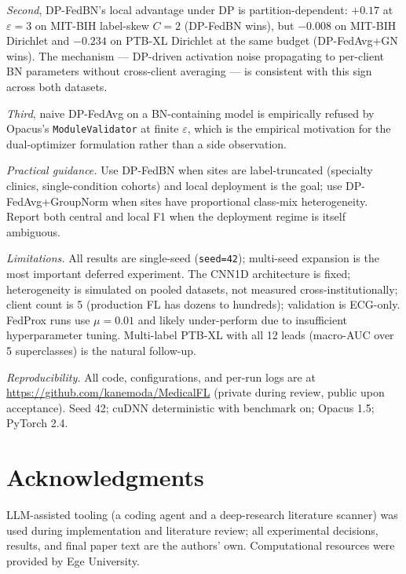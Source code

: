 \documentclass[conference]{IEEEtran}
\newcommand{\code}[1]{\texttt{\small #1}}
\begin{document}
\emph{Second}, DP-FedBN's local advantage under DP is partition-dependent: $+0.17$ at $\varepsilon{=}3$ on MIT-BIH label-skew $C{=}2$ (DP-FedBN wins), but $-0.008$ on MIT-BIH Dirichlet and $-0.234$ on PTB-XL Dirichlet at the same budget (DP-FedAvg+GN wins). The mechanism --- DP-driven activation noise propagating to per-client BN parameters without cross-client averaging --- is consistent with this sign across both datasets.

\emph{Third}, naive DP-FedAvg on a BN-containing model is empirically refused by Opacus's \code{ModuleValidator} at finite $\varepsilon$, which is the empirical motivation for the dual-optimizer formulation rather than a side observation.

\emph{Practical guidance.} Use DP-FedBN when sites are label-truncated (specialty clinics, single-condition cohorts) and local deployment is the goal; use DP-FedAvg+GroupNorm when sites have proportional class-mix heterogeneity. Report both central and local F1 when the deployment regime is itself ambiguous.

\emph{Limitations.} All results are single-seed (\code{seed=42}); multi-seed expansion is the most important deferred experiment. The CNN1D architecture is fixed; heterogeneity is simulated on pooled datasets, not measured cross-institutionally; client count is 5 (production FL has dozens to hundreds); validation is ECG-only. FedProx runs use $\mu{=}0.01$ and likely under-perform due to insufficient hyperparameter tuning. Multi-label PTB-XL with all 12 leads (macro-AUC over 5 superclasses) is the natural follow-up.

\emph{Reproducibility.} All code, configurations, and per-run logs are at \url{https://github.com/kanemoda/MedicalFL} (private during review, public upon acceptance). Seed 42; cuDNN deterministic with benchmark on; Opacus 1.5; PyTorch 2.4.

\section*{Acknowledgments}
LLM-assisted tooling (a coding agent and a deep-research literature scanner) was used during implementation and literature review; all experimental decisions, results, and final paper text are the authors' own. Computational resources were provided by Ege University.
\end{document}
